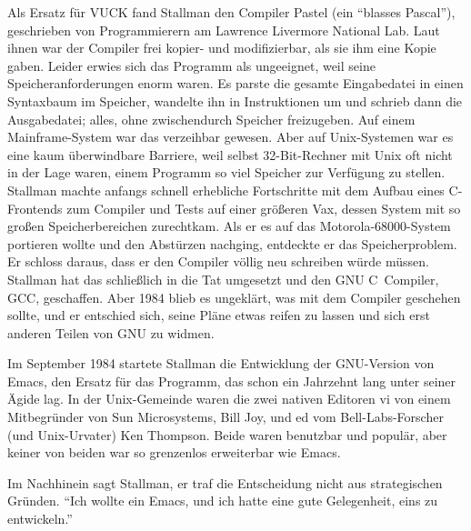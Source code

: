 Als Ersatz für VUCK fand Stallman den Compiler Pastel (ein "`blasses Pascal"'), geschrieben von Programmierern am Lawrence Livermore National Lab. Laut ihnen war der Compiler frei kopier- und modifizierbar, als sie ihm eine Kopie gaben. Leider erwies sich das Programm als ungeeignet, weil seine Speicheranforderungen enorm waren. Es parste die gesamte Eingabedatei in einen Syntaxbaum im Speicher, wandelte ihn in Instruktionen um und schrieb dann die Ausgabedatei; alles, ohne zwischendurch Speicher freizugeben. Auf einem Mainframe-System war das verzeihbar gewesen. Aber auf Unix-Systemen war es eine kaum überwindbare Barriere, weil selbst 32-Bit-Rechner mit Unix oft nicht in der Lage waren, einem Programm so viel Speicher zur Verfügung zu stellen. Stallman machte anfangs schnell erhebliche Fortschritte mit dem Aufbau eines C-Frontends zum Compiler und Tests auf einer größeren Vax, dessen System mit so großen Speicherbereichen zurechtkam. Als er es auf das Motorola-68000-System portieren wollte und den Abstürzen nachging, entdeckte er das Speicherproblem. Er schloss daraus, dass er den Compiler völlig neu schreiben würde müssen. Stallman hat das schließlich in die Tat umgesetzt und den GNU C~Compiler, GCC, geschaffen. Aber 1984 blieb es ungeklärt, was mit dem Compiler geschehen sollte, und er entschied sich, seine Pläne etwas reifen zu lassen und sich erst anderen Teilen von GNU zu widmen.

Im September 1984 startete Stallman die Entwicklung der GNU-Version von Emacs, den Ersatz für das Programm, das schon ein Jahrzehnt lang unter seiner Ägide lag. In der Unix-Gemeinde waren die zwei nativen Editoren vi von einem Mitbegründer von Sun Microsystems, Bill Joy, und ed vom Bell-Labs-Forscher (und Unix-Urvater) Ken Thompson. Beide waren benutzbar und populär, aber keiner von beiden war so grenzenlos erweiterbar wie Emacs.

Im Nachhinein sagt Stallman, er traf die Entscheidung nicht aus strategischen Gründen. "`Ich wollte ein Emacs, und ich hatte eine gute Gelegenheit, eins zu entwickeln."'

